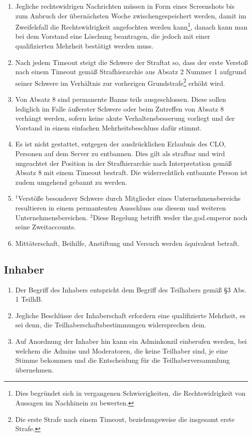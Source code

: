 \documentclass{article}
\begin{document}
\begin{enumerate}[(1)]
	\item Jegliche rechtswidrigen Nachrichten müssen in Form eines Screenshots bis zum Anbruch der übernächsten Woche zwischengespeichert werden, damit im Zweifelsfall die Rechtswidrigkeit angefochten werden kann\footnote{Dies begründet sich in vergangenen Schwierigkeiten, die Rechtswidrigkeit von Aussagen im Nachhinein zu bewerten.}, danach kann man bei dem Vorstand eine Löschung beantragen, die jedoch mit einer qualifizierten Mehrheit bestätigt werden muss.
	\item Nach jedem Timeout steigt die Schwere der Straftat so, dass der erste Verstoß nach einem Timeout gemäß Strafhierarchie aus Absatz 2 Nummer 1  aufgrund seiner Schwere im Verhältnis zur vorherigen Grundstrafe\footnote{Die erste Strafe nach einem Timeout, beziehungsweise die insgesamt erste Strafe.} erhöht wird.
	\item Von Absatz 8 sind permanente Banns teils ausgeschlossen. Diese sollen lediglich im Falle äußerster Schwere oder beim Zutreffen von Absatz 8 verhängt werden, sofern keine akute Verhaltensbesserung vorliegt und der Vorstand in einem einfachen Mehrheitsbeschluss dafür stimmt.
	\item Es ist nicht gestattet, entgegen der ausdrücklichen Erlaubnis des CLO, Personen auf dem Server zu entbannen. Dies gilt als strafbar und wird ungeachtet der Position in der Strafhierarchie nach Interpretation gemäß Absatz 8 mit einem Timeout bestraft. Die widerrechtlich entbannte Person ist zudem umgehend gebannt zu werden.
	\item $^{1}$Verstöße besonderer Schwere durch Mitglieder eines Unternehmensbereichs resultieren in einem permantenten Ausschluss aus diesem und weiteren Unternehmensbereichen. $^{2}$Diese Regelung betrifft weder the.god.emperor noch seine Zweitaccounts.
	\item Mittäterschaft, Beihilfe, Anstiftung und Versuch werden äquivalent betraft.
\end{enumerate}

\subsection{Inhaber}
\begin{enumerate}[(1)]
	\item Der Begriff des Inhabers entspricht dem Begriff des Teilhabers gemäß §3 Abs. 1 TeilhB.
	\item Jegliche Beschlüsse der Inhaberschaft erfordern eine qualifizierte Mehrheit, es sei denn, die Teilhaberschaftsbestimmungen widersprechen dem.
	\item Auf Anordnung der Inhaber hin kann ein Adminkonzil einberufen werden, bei welchem die Admins und Moderatoren, die keine Teilhaber sind, je eine Stimme bekommen und die Entscheidung für die Teilhaberversammlung übernehmen.
\end{enumerate}
\end{document}
